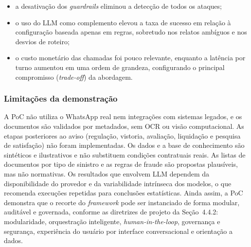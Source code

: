 \begin{itemize}
  \item a desativação dos \textit{guardrails} eliminou a detecção de todos os ataques;
  \item o uso do LLM como complemento elevou a taxa de sucesso em relação à configuração
        baseada apenas em regras, sobretudo nos relatos ambíguos e nos desvios de roteiro;
  \item o custo monetário das chamadas foi pouco relevante, enquanto a latência por turno
        aumentou em uma ordem de grandeza, configurando o principal compromisso
        (\textit{trade-off}) da abordagem.
\end{itemize}

\subsubsection{Limitações da demonstração}

A PoC não utiliza o WhatsApp real nem integrações com sistemas legados, e os documentos são
validados por metadados, sem OCR ou visão computacional. As etapas posteriores ao aviso
(regulação, vistoria, avaliação, liquidação e pesquisa de satisfação) não foram implementadas.
Os dados e a base de conhecimento são sintéticos e ilustrativos e não substituem condições
contratuais reais. As listas de documentos por tipo de sinistro e as regras de fraude são
propostas plausíveis, mas não normativas. Os resultados que envolvem LLM dependem da
disponibilidade do provedor e da variabilidade intrínseca dos modelos, o que recomenda
execuções repetidas para conclusões estatísticas. Ainda assim, a PoC demonstra que o recorte
do \textit{framework} pode ser instanciado de forma modular, auditável e governada, conforme as
diretrizes de projeto da Seção~4.4.2: modularidade, orquestração inteligente,
\textit{human-in-the-loop}, governança e segurança, experiência do usuário por interface
conversacional e orientação a dados.

